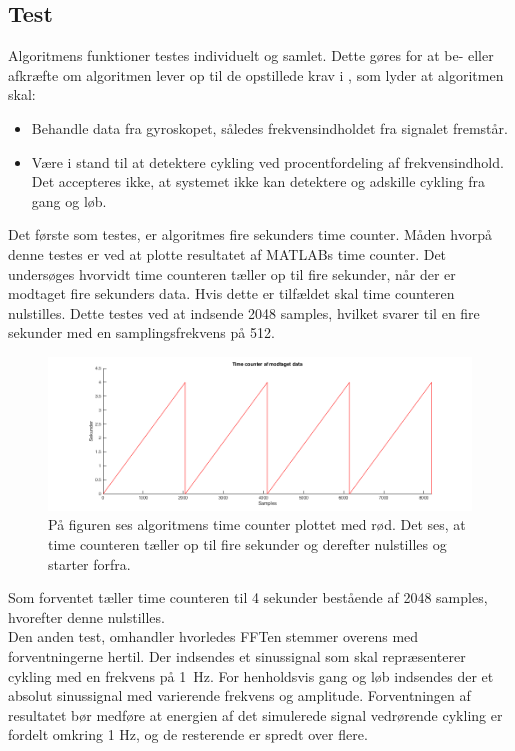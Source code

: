 \subsection{Test}
Algoritmens funktioner testes individuelt og samlet. Dette gøres for at be- eller afkræfte om algoritmen lever op til de opstillede krav i , som lyder at algoritmen skal:
\begin{itemize}
	\item Behandle data fra gyroskopet, således frekvensindholdet fra signalet fremstår.
	\item Være i stand til at detektere cykling ved procentfordeling af frekvensindhold. Det accepteres ikke, at systemet ikke kan detektere og adskille cykling fra gang og løb.
\end{itemize}

Det første som testes, er algoritmes fire sekunders time counter. Måden hvorpå denne testes er ved at plotte resultatet af MATLABs time counter. Det undersøges hvorvidt time counteren tæller op til fire sekunder, når der er modtaget fire sekunders data. Hvis dette er tilfældet skal time counteren nulstilles. Dette testes ved at indsende 2048 samples, hvilket svarer til en fire sekunder med en samplingsfrekvens på 512.  
\begin{figure}[H]
	\centering
	\includegraphics[width=1.0\textwidth]{figures/cDesign/sim_counter.png}
	\caption{På figuren ses algoritmens time counter plottet med rød. Det ses, at time counteren tæller op til fire sekunder og derefter nulstilles og starter forfra.}
	\label{fig:sim_count}
\end{figure}
Som forventet tæller time counteren til 4 sekunder bestående af 2048 samples, hvorefter denne nulstilles.\\
Den anden test, omhandler hvorledes FFTen stemmer overens med forventningerne hertil. Der indsendes et sinussignal som skal repræsenterer cykling med en frekvens på 1~Hz. For henholdsvis gang og løb indsendes der et absolut sinussignal med varierende frekvens og amplitude. Forventningen af resultatet bør medføre at energien af det simulerede signal vedrørende cykling er fordelt omkring 1 Hz, og de resterende er spredt over flere. \\
